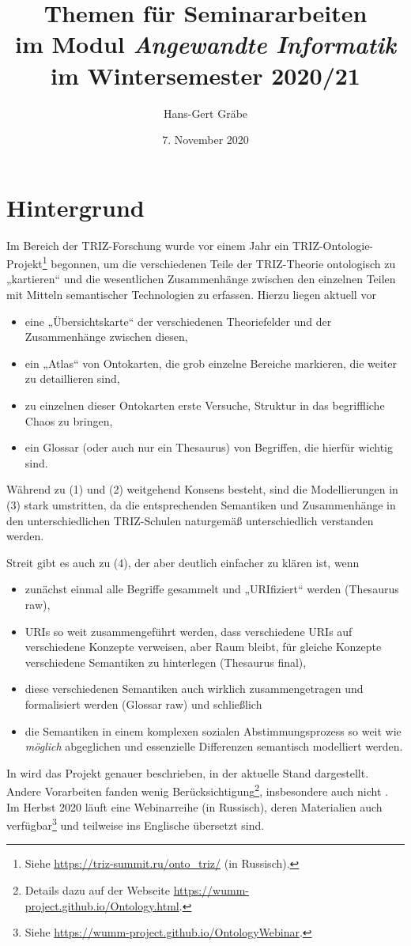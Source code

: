 \documentclass[11pt,a4paper]{article}
\title{Themen für Seminararbeiten\\ im Modul \emph{Angewandte Informatik}\\ im
  Wintersemester 2020/21}
\author{Hans-Gert Gr\"abe}
\date{7. November 2020}
\begin{document}
\maketitle

\section{Hintergrund}

Im Bereich der TRIZ-Forschung wurde vor einem Jahr ein
TRIZ-Ontologie-Projekt\footnote{Siehe \url{https://triz-summit.ru/onto_triz/}
  (in Russisch).}  begonnen, um die verschiedenen Teile der TRIZ-Theorie
ontologisch zu „kartieren“ und die wesentlichen Zusammenhänge zwischen den
einzelnen Teilen mit Mitteln semantischer Technologien zu erfassen. Hierzu
liegen aktuell vor
\begin{itemize}
\item[(1)] eine „Übersichtskarte“ der verschiedenen Theoriefelder und der
  Zusammenhänge zwischen diesen,
\item[(2)] ein „Atlas“ von Ontokarten, die grob einzelne Bereiche markieren,
  die weiter zu detaillieren sind,
\item[(3)] zu einzelnen dieser Ontokarten erste Versuche, Struktur in das
  begriff\-liche Chaos zu bringen,
\item[(4)] ein Glossar (oder auch nur ein Thesaurus) von Begriffen, die
  hierfür wichtig sind.
\end{itemize}

Während zu (1) und (2) weitgehend Konsens besteht, sind die Modellierungen in
(3) stark umstritten, da die entsprechenden Semantiken und Zusammenhänge in
den unterschiedlichen TRIZ-Schulen naturgemäß unterschiedlich verstanden
werden.

Streit gibt es auch zu (4), der aber deutlich einfacher zu klären ist, wenn 
\begin{itemize}
\item[(4a)] zunächst einmal alle Begriffe gesammelt und „URIfiziert“ werden
  (Thesaurus raw),
\item[(4b)] URIs so weit zusammengeführt werden, dass verschiedene URIs auf
  verschiedene Konzepte verweisen, aber Raum bleibt, für gleiche Konzepte
  verschiedene Semantiken zu hinterlegen (Thesaurus final),
\item[(4c)] diese verschiedenen Semantiken auch wirklich zusammengetragen und
  formalisiert werden (Glossar raw) und schließlich
\item[(4d)] die Semantiken in einem komplexen sozialen Abstimmungsprozess so
  weit wie \emph{möglich} abgeglichen und essenzielle Differenzen semantisch
  modelliert werden. 
\end{itemize}
In \cite{Kuryan2019} wird das Projekt genauer beschrieben, in
\cite{Kuryan2020} der aktuelle Stand dargestellt. Andere Vorarbeiten fanden
wenig Berücksichtigung\footnote{Details dazu auf der Webseite
  \url{https://wumm-project.github.io/Ontology.html}.}, insbesondere auch
nicht \cite{VDI}. Im Herbst 2020 läuft eine Webinarreihe (in Russisch), deren
Materialien auch verfügbar\footnote{Siehe
  \url{https://wumm-project.github.io/OntologyWebinar}.} und teilweise ins
Englische übersetzt sind.
\end{document}
